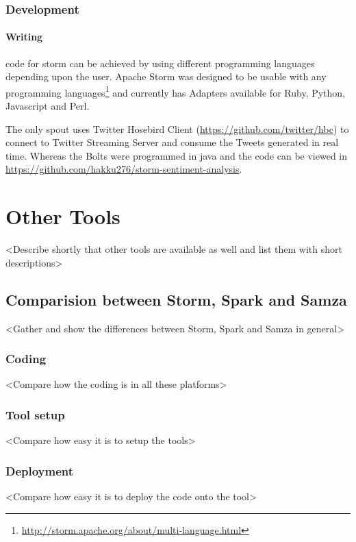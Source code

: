 \documentclass[runningheads,a4paper]{llncs}[2015/06/24]
\begin{document}
\subsubsection{Development}
\paragraph{Writing} code for storm can be achieved by using different programming languages depending upon the user. Apache Storm was designed to be usable with any programming languages\footnote{\url{http://storm.apache.org/about/multi-language.html}} and currently has Adapters available for Ruby, Python, Javascript and Perl.

The only spout uses Twitter Hosebird Client (\url{https://github.com/twitter/hbc}) to connect to Twitter Streaming Server and consume the Tweets generated in real time. Whereas the Bolts were programmed in java and the code can be viewed in \url{https://github.com/hakku276/storm-sentiment-analysis}.

\section{Other Tools}
 \label{sec:othertools}
 
 <Describe shortly that other tools are available as well and list them with short descriptions>
 
 \subsection{Comparision between Storm, Spark and Samza}
 
 <Gather and show the differences between Storm, Spark and Samza in general>
 
 \subsubsection{Coding}
 <Compare how the coding is in all these platforms>
 
 \subsubsection{Tool setup}
 <Compare how easy it is to setup the tools>
 
 \subsubsection{Deployment}
 <Compare how easy it is to deploy the code onto the tool>
 
\end{document}
